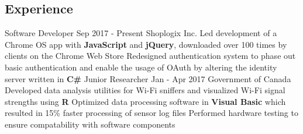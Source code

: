 \documentclass[]{aanguyen_res}
\begin{document}
	\begin{main}%
		\vspace{35pt}%
		\section{Experience}
			\mainentry%
				{Software Developer}%
				{Sep 2017 - Present}%
				{Shoplogix Inc.}%
				{}%
				{\faCaretRight Led development of a Chrome OS app with \textbf{JavaScript} and \textbf{jQuery}, downloaded over 100 times by clients on the Chrome Web Store
				\faCaretRight Redesigned authentication system to phase out basic authentication and enable the usage of OAuth by altering the identity server written in \textbf{C\#}}
			\vspace{0.1cm}%
			\mainentry%
				{Junior Researcher}%
				{Jan - Apr 2017}%
				{Government of Canada}%
				{}%
				{\faCaretRight Developed data analysis utilities for Wi-Fi sniffers and visualized Wi-Fi signal strengths using \textbf{R}
				  \faCaretRight Optimized data processing software in \textbf{Visual Basic} which resulted in 15\% faster processing of sensor log files
				  \faCaretRight Performed hardware testing to ensure compatability with software components}
			\vspace{0.65cm}%

\end{main}
\end{document}
